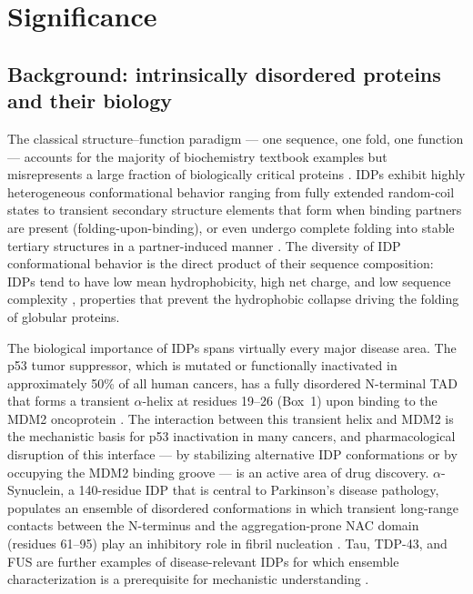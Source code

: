 \documentclass[12pt]{article}
\begin{document}
\section{Significance}

\subsection{Background: intrinsically disordered proteins and their biology}

The classical structure--function paradigm --- one sequence, one fold, one function --- accounts
for the majority of biochemistry textbook examples but misrepresents a large fraction of
biologically critical proteins \cite{dyson2005idp}.
IDPs exhibit highly heterogeneous conformational behavior ranging from fully extended
random-coil states to transient secondary structure elements that form when binding partners
are present (folding-upon-binding), or even undergo complete folding into stable tertiary
structures in a partner-induced manner \cite{wright2009idp_binding}.
The diversity of IDP conformational behavior is the direct product of their sequence
composition: IDPs tend to have low mean hydrophobicity, high net charge, and low sequence
complexity \cite{uversky2014idp_review}, properties that prevent the hydrophobic collapse
driving the folding of globular proteins.

The biological importance of IDPs spans virtually every major disease area.
The p53 tumor suppressor, which is mutated or functionally inactivated in approximately
50\% of all human cancers, has a fully disordered N-terminal TAD that forms a transient
$\alpha$-helix at residues 19--26 (Box~1) upon binding to the MDM2 oncoprotein
\cite{raj2022p53}.
The interaction between this transient helix and MDM2 is the mechanistic basis for p53
inactivation in many cancers, and pharmacological disruption of this interface --- by
stabilizing alternative IDP conformations or by occupying the MDM2 binding groove --- is an
active area of drug discovery.
$\alpha$-Synuclein, a 140-residue IDP that is central to Parkinson's disease pathology,
populates an ensemble of disordered conformations in which transient long-range contacts
between the N-terminus and the aggregation-prone NAC domain (residues 61--95) play an
inhibitory role in fibril nucleation \cite{bhatt2021asyn}.
Tau, TDP-43, and FUS are further examples of disease-relevant IDPs for which ensemble
characterization is a prerequisite for mechanistic understanding \cite{uversky2008idp_disease}.
\end{document}
